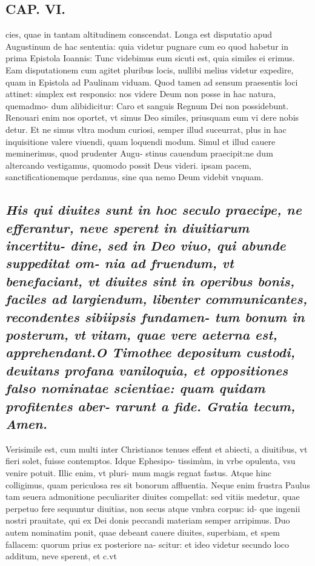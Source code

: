 \documentclass{article}
\begin{document}
\begin{pages}
\section*{CAP. VI. }
\marginpar{[ p.83 ]}\pstart cies, quae in tantam altitudinem conscendat. Longa est disputatio apud Augustinum de hac sententia: quia videtur pugnare cum eo quod habetur in prima Epistola Ioannis: Tunc videbimus eum sicuti est, quia similes ei erimus. Eam disputationem cum agitet pluribus locis, nullibi melius videtur expedire, quam in Epistola ad Paulinam viduam. Quod tamen ad sensum praesentis loci attinet: simplex est responsio: nos videre Deum non posse in hac natura, quemadmo- dum alibidicitur: Caro et sanguis Regnum Dei non possidebunt. Renouari enim nos oportet, vt simus Deo similes, priusquam eum vi dere nobis detur. Et ne simus vltra modum curiosi, semper illud suceurrat, plus in hac inquisitione valere viuendi, quam loquendi modum. Simul et illud cauere meminerimus, quod prudenter Augu- stinus cauendum praecipit:ne dum altercando vestigamus, quomodo possit Deus videri. ipsam pacem, sanctificationemque perdamus, sine qua nemo Deum videbit vnquam.  \pend
{}
{}
\subsection*{\textit{His qui diuites sunt in hoc seculo praecipe, ne efferantur, neve sperent in diuitiarum incertitu- dine, sed in Deo viuo, qui abunde suppeditat om- nia ad fruendum, vt benefaciant, vt diuites sint in operibus bonis, faciles ad largiendum, libenter communicantes, recondentes sibiipsis fundamen- tum bonum in posterum, vt vitam, quae vere aeterna est, apprehendant.O Timothee depositum custodi, deuitans profana vaniloquia, et oppositiones falso nominatae scientiae: quam quidam profitentes aber- rarunt a fide. Gratia tecum, Amen. }}\pstart Verisimile est, cum multi inter Christianos tenues effent et abiecti, a diuitibus, vt fieri solet, fuisse contemptos. Idque Ephesipo- tissimùm, in vrbe opulenta, vsu venire potuit. Illic enim, vt pluri- mum magis regnat fastus. Atque hinc colligimus, quam periculosa res sit bonorum affluentia. Neque enim frustra Paulus tam seuera admonitione peculiariter diuites compellat: sed vitiis medetur, quae perpetuo fere sequuntur diuitias, non secus atque vmbra corpus: id- que ingenii nostri prauitate, qui ex Dei donis peccandi materiam semper arripimus. Duo autem nominatim ponit, quae debeant cauere diuites, superbiam, et spem fallacem: quorum prius ex posteriore na- scitur: et ideo videtur secundo loco additum, neve sperent, et c.vt  \pend

\end{pages}
\end{document}
